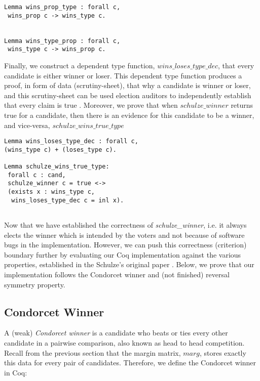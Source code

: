 \documentclass[compsoc,conference,a4paper,10pt,times]{IEEEtran}
\begin{document}
\begin{verbatim}
Lemma wins_prop_type : forall c, 
 wins_prop c -> wins_type c.
   

Lemma wins_type_prop : forall c, 
 wins_type c -> wins_prop c.  
\end{verbatim}

\noindent
Finally, we construct a dependent type function, $wins\_loses\_type\_dec$, 
that every candidate is either winner or loser. This dependent type 
function produces a proof, in form of 
data (scrutiny-sheet), that why a candidate is winner or loser, and this 
scrutiny-sheet can be used election auditors to independently establish 
that every claim is true \cite{Arkoudas:2005:DRC}. Moreover,
we prove that when $schulze\_winner$ returns true for a candidate, then
there is an evidence for this candidate to be a winner, and vice-versa, 
$schulze\_wins\_true\_type$

\begin{verbatim}
Lemma wins_loses_type_dec : forall c, 
(wins_type c) + (loses_type c).

Lemma schulze_wins_true_type: 
 forall c : cand, 
 schulze_winner c = true <-> 
 (exists x : wins_type c, 
  wins_loses_type_dec c = inl x).


\end{verbatim}




Now that we have established the correctness of \textit{schulze\_winner},
i.e. it always elects the winner which is intended by the voters and 
not because of software bugs in the implementation. However, we can push this
correctness (criterion) boundary further by evaluating our Coq implementation against 
the various properties, established in the Schulze's 
original paper \cite{Schulze:2011:NMC}. Below, we prove that our 
implementation follows the Condorcet winner and (not finished)
reversal symmetry property. 


 
\subsection{Condorcet Winner}
	A (weak) \textit{Condorcet winner} is a candidate who beats or ties 
	every other candidate in a 
	pairwise comparison, also known as head to head competition. 
	Recall from the previous section that the margin matrix, $marg$, 
	stores exactly this data for every pair of candidates.
	Therefore, we define the Condorcet winner in Coq:
\end{document}
